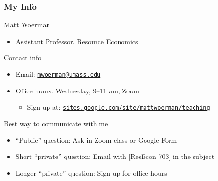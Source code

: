 \documentclass{beamer}
\begin{document}
\begin{frame}\frametitle{My Info}
    Matt Woerman
    \begin{itemize}
        \item Assistant Professor, Resource Economics
    \end{itemize}
    \vspace{2ex}
    Contact info
    \begin{itemize}
        \item Email: \href{mailton:mwoerman@umass.edu}{\texttt{mwoerman@umass.edu}}
        \item Office hours: Wednesday, 9--11 am, Zoom
        \begin{itemize}
        	\item Sign up at: \href{https://sites.google.com/site/mattwoerman/teaching}{\texttt{sites.google.com/site/mattwoerman/teaching}}
        \end{itemize}
    \end{itemize}
    \vspace{2ex}
    Best way to communicate with me
    \begin{itemize}
        \item ``Public'' question: Ask in Zoom class or Google Form
        \item Short ``private'' question: Email with [ResEcon 703] in the subject
        \item Longer ``private'' question: Sign up for office hours
    \end{itemize}
\end{frame}
\end{document}
